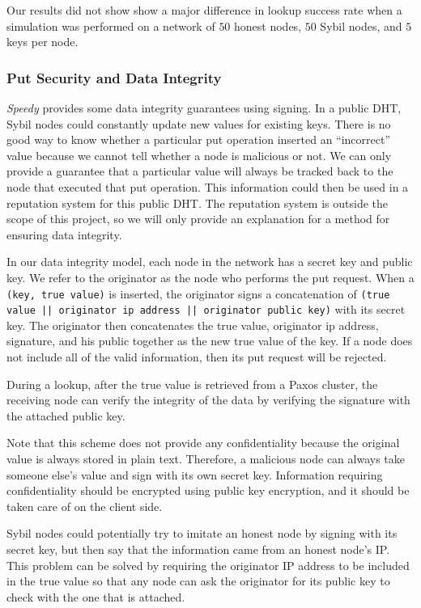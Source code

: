 \documentclass[letter]{article}
\newcommand{\sys}{\textit{Speedy}}
\begin{document}
Our results did not show show a major difference in lookup success rate when a simulation was performed on a network of $50$ honest nodes, $50$ Sybil nodes, and $5$ keys per node.

\subsubsection{Put Security and Data Integrity}
\sys{} provides some data integrity guarantees using signing. In a public DHT, Sybil nodes could constantly update
new values for existing keys. There is no good way to know whether a particular
put operation inserted an ``incorrect'' value because we cannot tell whether
a node is malicious or not. We can only provide a guarantee that a particular
value will always be tracked back to the node that executed that put operation.
This information could then be used in a reputation system for this public DHT.
The reputation system is outside the scope of this project, so we will only
provide an explanation for a method for ensuring data integrity.

In our data integrity model,
each node in the network has a secret key and public key. We refer to the originator as the node who performs the put request. When a \texttt{(key, true value)} is inserted, the originator signs a concatenation of \texttt{(true value || originator ip address || originator public key)} with its secret key.
The originator then concatenates the true value, originator ip address, signature, and his public together as the new true value of the key.
If a node does not include all of the valid information, then its put request will be rejected.

During a lookup, after the true value is retrieved from a Paxos cluster, the receiving node can verify the integrity of the data by verifying the signature with the attached public key.

Note that this scheme does not provide any confidentiality because the original value
is always stored in plain text. Therefore, a malicious node can always take someone else's value and sign with its own secret key. Information requiring confidentiality should be
encrypted using public key encryption, and it should be taken care of on the client side.

Sybil nodes could potentially try to imitate an honest node by signing with its secret key,
but then say that the information came from an honest node's IP. This problem can be solved by
requiring the originator IP address to be included in the true value so that any node can ask the originator for its public key to check with the one that is attached.
\end{document}
